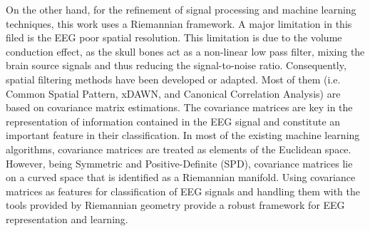 
On the other hand, for the refinement of signal processing and machine learning techniques, this work uses a Riemannian framework.
A major limitation in this filed is the EEG poor spatial resolution. 
This limitation is due to the volume conduction effect, as the skull bones act as a non-linear low pass filter, mixing the brain source signals and thus reducing the signal-to-noise ratio. 
Consequently, spatial filtering methods have been developed or adapted. 
Most of them (i.e. Common Spatial Pattern, xDAWN, and Canonical Correlation Analysis) are based on covariance matrix estimations. 
The covariance matrices are key in the representation of information contained in the EEG signal and constitute an important feature in their classification.
In most of the existing machine learning algorithms, covariance matrices are treated as elements of the Euclidean space. 
However, being Symmetric and Positive-Definite (SPD), covariance matrices lie on a curved space that is identified as a Riemannian manifold. 
Using covariance matrices as features for classification of EEG signals and handling them with the tools provided by Riemannian geometry provide a robust framework for EEG representation and learning. 

